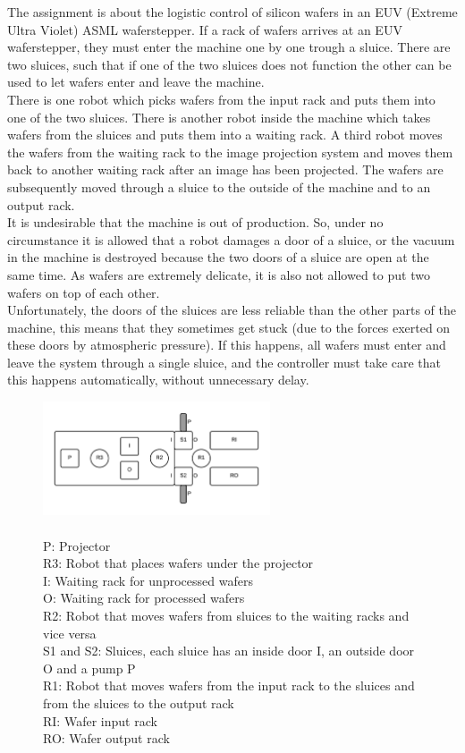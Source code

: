 The assignment is about the logistic control of silicon wafers in an EUV (Extreme Ultra Violet) ASML waferstepper. If a rack of wafers arrives at an EUV waferstepper, they must enter the machine one by one trough a sluice. There are two sluices, such that if one of the two sluices does not function the other can be used to let wafers enter and leave the machine.\\

There is one robot which picks wafers from the input rack and puts them into one of the two sluices. There is another robot inside the machine which takes wafers from the sluices and puts them into a waiting rack. A third robot moves the wafers from the waiting rack to the image projection system and moves them back to another waiting rack after an image has been projected. The wafers are subsequently moved through a sluice to the outside of the machine and to an output rack.\\

It is undesirable that the machine is out of production. So, under no circumstance it is allowed that a robot damages a door of a sluice, or the vacuum in the machine is destroyed because the two doors of a sluice are open at the same time. As wafers are extremely delicate, it is also not allowed to put two wafers on top of each other.\\

Unfortunately, the doors of the sluices are less reliable than the other parts of the machine, this means that they sometimes get stuck (due to the forces exerted on these doors by atmospheric pressure). If this happens, all wafers must enter and leave the system through a single sluice, and the controller must take care that this happens automatically, without unnecessary delay.

\begin{figure}[h]
    \centering
	\includegraphics[width=0.6\textwidth]{waferstepper.png}
	\caption{\\P: Projector\\R3: Robot that places wafers under the projector\\I: Waiting rack for unprocessed wafers\\O: Waiting rack for processed wafers\\R2: Robot that moves wafers from sluices to the waiting racks and vice versa\\S1 and S2: Sluices, each sluice has an inside door I, an outside door O and a pump P\\R1: Robot that moves wafers from the input rack to the sluices and from the sluices to the output rack\\RI: Wafer input rack\\RO: Wafer output rack}
\end{figure}